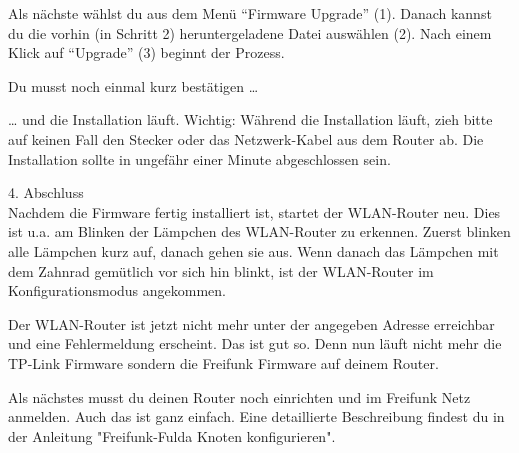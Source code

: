 \documentclass[11pt, a4paper,ngerman]{article}
\begin{document}




Als nächste wählst du aus dem Menü “Firmware Upgrade” (1). Danach kannst du die vorhin (in Schritt 2) heruntergeladene Datei auswählen (2). Nach einem Klick auf “Upgrade” (3) beginnt der Prozess.





Du musst noch einmal kurz bestätigen …





… und die Installation läuft.
Wichtig: Während die Installation läuft, zieh bitte auf keinen Fall den Stecker oder das Netzwerk-Kabel aus dem Router ab. Die Installation sollte in ungefähr einer Minute abgeschlossen sein.







{\Large 4. Abschluss} \\

Nachdem die Firmware fertig installiert ist, startet der WLAN-Router neu. Dies ist u.a. am Blinken der Lämpchen des WLAN-Router zu erkennen. Zuerst blinken alle Lämpchen kurz auf, danach gehen sie aus. Wenn danach das Lämpchen mit dem Zahnrad gemütlich vor sich hin blinkt, ist der WLAN-Router im Konfigurationsmodus angekommen.

Der WLAN-Router ist jetzt nicht mehr unter der angegeben Adresse erreichbar und eine Fehlermeldung erscheint. Das ist gut so. Denn nun läuft nicht mehr die TP-Link Firmware sondern die Freifunk Firmware auf deinem Router.





Als nächstes musst du deinen Router noch einrichten und im Freifunk Netz anmelden. Auch das ist ganz einfach. Eine detaillierte Beschreibung findest du in der Anleitung "Freifunk-Fulda Knoten konfigurieren".
\end{document}
